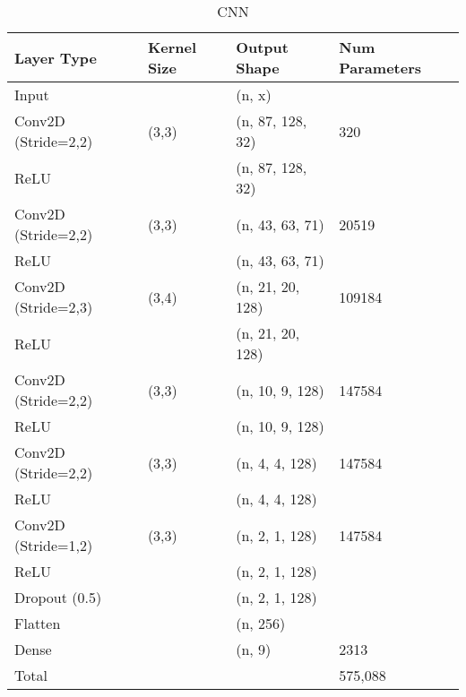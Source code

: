 \begin{table}[ht]
\caption{CNN}
\centering
\begin{tabular}{l|l|l|l}
Layer Type & Kernel Size & Output Shape & Num Parameters \\ \hline
Input & \ & (n, x) & \\
Conv2D (Stride=2,2) & (3,3) & (n, 87, 128, 32) & 320\\
ReLU                &       & (n, 87, 128, 32) & \\
Conv2D (Stride=2,2) & (3,3) & (n, 43, 63, 71) & 20519\\
ReLU                &       & (n, 43, 63, 71) & \\
Conv2D (Stride=2,3) & (3,4) & (n, 21, 20, 128) & 109184\\
ReLU                &       & (n, 21, 20, 128) & \\
Conv2D (Stride=2,2) & (3,3) & (n, 10, 9, 128) & 147584\\
ReLU                &       & (n, 10, 9, 128) & \\
Conv2D (Stride=2,2) & (3,3) & (n, 4, 4, 128) & 147584\\
ReLU                &       & (n, 4, 4, 128) & \\
Conv2D (Stride=1,2) & (3,3) & (n, 2, 1, 128) & 147584\\
ReLU                &       & (n, 2, 1, 128) & \\
Dropout (0.5)       &       & (n, 2, 1, 128) & \\
Flatten             &       & (n, 256) & \\
Dense               &       & (n, 9) & 2313\\
\hline
\hline
Total               &       &        & 575,088\\
\end{tabular}
\end{table}
